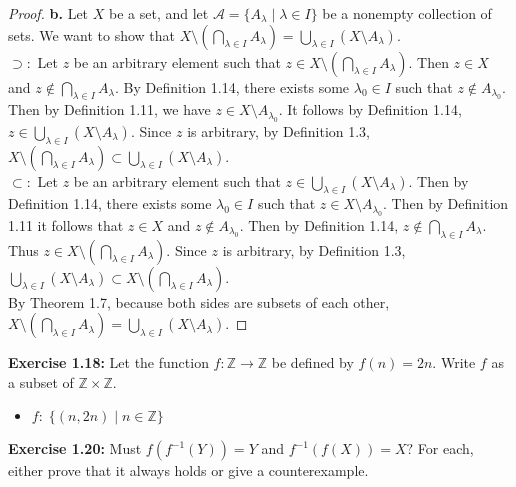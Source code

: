 \documentclass[11pt]{article}
\begin{document}
\begin{proof}
\textbf{b.} Let $X$ be a set, and let $\mathcal{A} = \{ A_{\lambda} \mid \lambda \in I \}$ be a nonempty collection of sets. We want to show that $X \setminus \left( \bigcap_{\lambda \in I} A_{\lambda} \right) = \bigcup_{\lambda \in I} ( X \setminus A_{\lambda})$. \\
$\supset:$ Let $z$ be an arbitrary element such that $z \in X \setminus \left( \bigcap_{\lambda \in I} A_{\lambda} \right)$. Then $z \in X$ and $z \notin \bigcap_{\lambda \in I} A_{\lambda}$. By Definition 1.14, there exists some $\lambda_0 \in I$ such that $z \notin A_{\lambda_0}$. Then by Definition 1.11, we have $z \in X \setminus A_{\lambda_0}$. It follows by Definition 1.14, $z \in \bigcup_{\lambda \in I} (X \setminus A_{\lambda})$. Since $z$ is arbitrary, by Definition 1.3, $X \setminus \left( \bigcap_{\lambda \in I} A_{\lambda} \right) \subset \bigcup_{\lambda \in I} (X \setminus A_{\lambda})$. \\
$\subset:$ Let $z$ be an arbitrary element such that $z \in \bigcup_{\lambda \in I} (X \setminus A_{\lambda})$. Then by Definition 1.14, there exists some $\lambda_0 \in I$ such that $z \in X \setminus A_{\lambda_0}$. Then by Definition 1.11 it follows that $z \in X$ and $z \notin A_{\lambda_0}$. Then by Definition 1.14, $z \notin \bigcap_{\lambda \in I} A_{\lambda}$. Thus $z \in X \setminus \left( \bigcap_{\lambda \in I} A_{\lambda} \right)$. Since $z$ is arbitrary, by Definition 1.3, $\bigcup_{\lambda \in I} (X \setminus A_{\lambda}) \subset X \setminus \left( \bigcap_{\lambda \in I} A_{\lambda} \right)$. \\
By Theorem 1.7, because both sides are subsets of each other, $X \setminus \left( \bigcap_{\lambda \in I} A_{\lambda} \right) = \bigcup_{\lambda \in I} ( X \setminus A_{\lambda})$.
\end{proof}
\noindent\textbf{Exercise 1.18:} Let the function $f \colon \mathds{Z} \rightarrow \mathds{Z}$ be defined by
$f(n)=2n$.  Write $f$ as a subset of $\mathds{Z} \times \mathds{Z}$.  
\begin{itemize}
    \item $f:\; \{(n, 2n) \mid n \in \mathds{Z} \}$
\end{itemize}
\textbf{Exercise 1.20:} Must $f(f^{-1}(Y))=Y$ and $f^{-1}(f(X))=X?$ For each, either prove that it always holds or give a counterexample.
\end{document}
